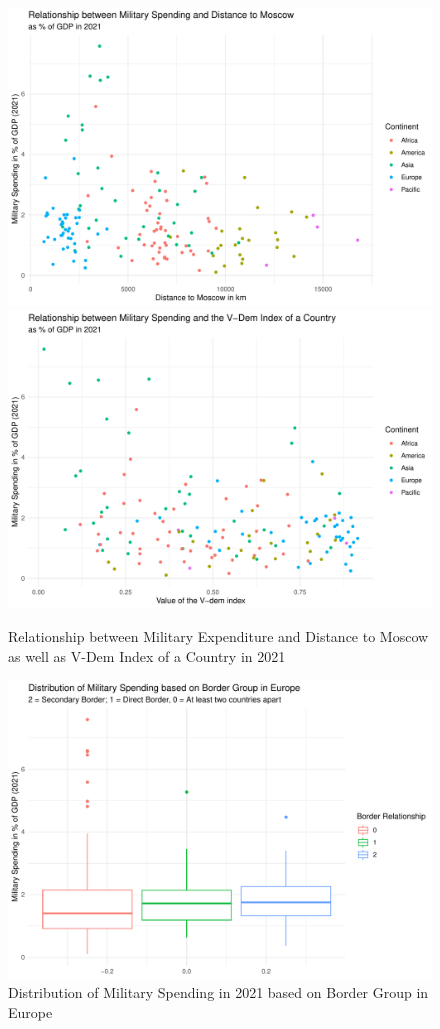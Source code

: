 \documentclass[12pt,a4paper]{article}
\begin{document}
\begin{figure}
\center
\label{F:2}
\includegraphics[scale=0.36]{Plot2.pdf}
\includegraphics[scale=0.36]{Plot3.pdf}
\caption{Relationship between Military Expenditure and Distance to Moscow as well as V-Dem Index of a Country in 2021}
\end{figure}



\begin{figure}
\center
\label{F:3}
\includegraphics[scale=0.45]{Plot4.pdf}
\caption{Distribution of Military Spending in 2021 based on Border Group in Europe}
\end{figure}
\end{document}
